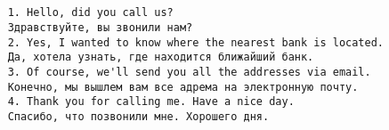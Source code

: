 \subsection*{}
\begin{verbatim}
    1. Hello, did you call us?
    Здравствуйте, вы звонили нам?
    2. Yes, I wanted to know where the nearest bank is located.
    Да, хотела узнать, где находится ближайший банк.
    3. Of course, we'll send you all the addresses via email.
    Конечно, мы вышлем вам все адрема на электронную почту.
    4. Thank you for calling me. Have a nice day.
    Спасибо, что позвонили мне. Хорошего дня.
\end{verbatim}